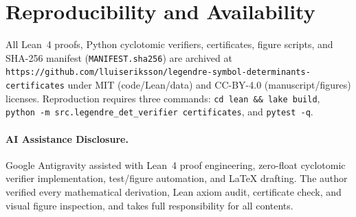 \documentclass[10pt,twocolumn]{article}
\begin{document}
\section{Reproducibility and Availability}
All Lean~4 proofs, Python cyclotomic verifiers, certificates, figure scripts, and SHA-256 manifest (\texttt{MANIFEST.sha256}) are archived at \nolinkurl{https://github.com/lluiseriksson/legendre-symbol-determinants-certificates} under MIT (code/Lean/data) and CC-BY-4.0 (manuscript/figures) licenses. Reproduction requires three commands: \texttt{cd lean \&\& lake build}, \texttt{python -m src.legendre\_det\_verifier certificates}, and \texttt{pytest -q}.

\paragraph{AI Assistance Disclosure.}
Google Antigravity assisted with Lean~4 proof engineering, zero-float cyclotomic verifier implementation, test/figure automation, and LaTeX drafting. The author verified every mathematical derivation, Lean axiom audit, certificate check, and visual figure inspection, and takes full responsibility for all contents.



\end{document}
